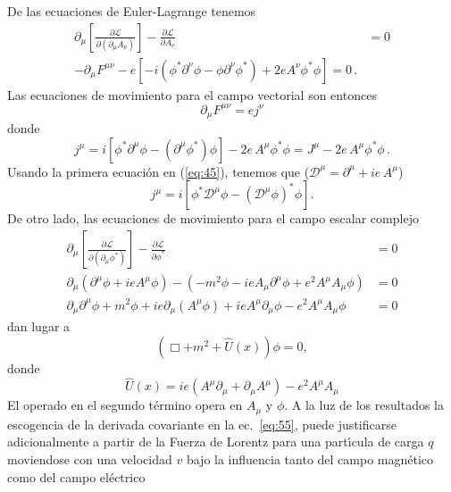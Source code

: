 De las ecuaciones de Euler-Lagrange tenemos
\begin{align}
    \partial_\mu\left[
    \frac{\partial\mathcal{L}}{\partial(\partial_\mu A_\nu)}  
  \right]-\frac{\partial\mathcal{L}}{\partial A_\nu}&=0\nonumber\\
-\partial_\mu F^{\mu\nu}-e\left[-i(\phi^*\partial^\nu\phi-\phi\partial^\nu\phi^*)+2eA^\nu \phi^*\phi\right]=0\,.
\end{align}
Las ecuaciones de movimiento para el campo vectorial son entonces
\begin{equation}
  \partial_\mu F^{\mu\nu}=ej^\nu
\end{equation}
donde 
\begin{equation}
\label{eq:60}
  j^\mu=i
  \left[
    \phi^*\partial^\mu\phi-
      (\partial^\mu\phi^*)\phi
  \right]-2e\,A^\mu\phi^*\phi=J^\mu-2e\,A^\mu\phi^*\phi\,.
\end{equation}
Usando la primera ecuaci\'on en (\ref{eq:45}), tenemos que ($\mathcal{D}^\mu=\partial^\mu+ie\,A^\mu$)
\begin{equation}
  j^\mu=i
  \left[
    \phi^*\mathcal{D}^\mu\phi-
    \left(
      \mathcal{D}^\mu\phi
    \right)^*\phi
  \right].
\end{equation}
De otro lado, las ecuaciones de movimiento para el campo escalar complejo 
\begin{align}
  \label{eq:155}
    \partial_\mu\left[
      \frac{\partial\mathcal{L}}{\partial(\partial_\mu\phi^*)}\right]-\frac{\partial\mathcal{L}}{\partial\phi^*}&=0\nonumber\\
    \partial_\mu(\partial^\mu\phi+i e A^\mu\phi)-(-m^2\phi-ieA_\mu\partial^\mu\phi+e^2A^\mu A_\mu\phi)&=0\nonumber\\
   \partial_\mu\partial^\mu\phi+m^2\phi+ie\partial_\mu (A^\mu\phi)+ieA^\mu\partial_\mu\phi-e^2A^\mu A_\mu\phi&=0
\end{align}
dan lugar a
\begin{equation}
  (\Box +m^2+\hat{U}(x))\phi=0,
\end{equation}
donde
\begin{equation}
  \label{eq:58}
  \hat{U}(x)=ie(A^\mu\partial_\mu+\partial_\mu A^\mu)-e^2A^\mu A_\mu
\end{equation}
El operado en el segundo t\'ermino opera en $A_\mu$ y $\phi$. A la luz de los resultados la escogencia de la derivada covariante en la ec.~\eqref{eq:55}, puede justificarse adicionalmente a partir de la Fuerza de Lorentz para una part\'\i cula de carga $q$  moviendose con una velocidad $v$ bajo la influencia tanto del campo magn\'etico como del campo el\'ectrico
